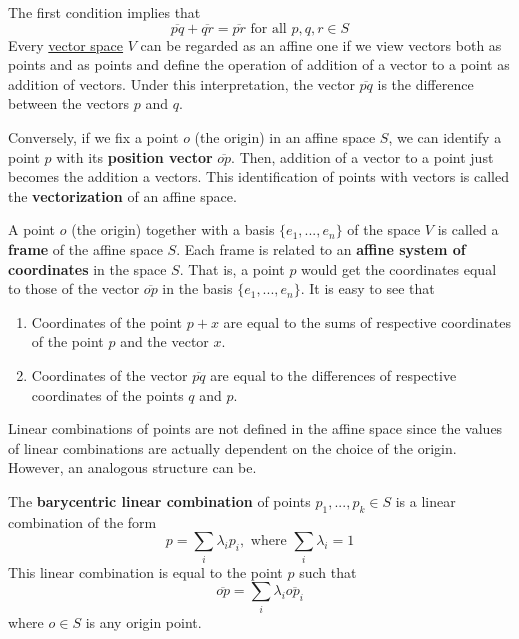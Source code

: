   The first condition implies that
  \begin{equation}
    \overline{pq} + \overline{qr} = \overline{pr} \text{ for all } p, q, r \in S
  \end{equation}
  Every \hyperref[def:vector-space]{vector space} $V$ can be regarded as an affine one if we view vectors both as points and as points and define the operation of addition of a vector to a point as addition of vectors. Under this interpretation, the vector $\overline{pq}$ is the difference between the vectors $p$ and $q$. 

  \begin{definition}
    \label{def:position-vector}
    Conversely, if we fix a point $o$ (the origin) in an affine space $S$, we can identify a point $p$ with its \textbf{position vector} $\overline{op}$. Then, addition of a vector to a point just becomes the addition a vectors. This identification of points with vectors is called the \textbf{vectorization} of an affine space. 
  \end{definition}

  \begin{definition}
    \label{def:frame-of-an-affine-space}
    A point $o$ (the origin) together with a basis $\{e_1, ..., e_n\}$ of the space $V$ is called a \textbf{frame} of the affine space $S$. Each frame is related to an \textbf{affine system of coordinates} in the space $S$. That is, a point $p$ would get the coordinates equal to those of the vector $\overline{op}$ in the basis $\{e_1, ..., e_n\}$. It is easy to see that 
    \begin{enumerate}
      \item Coordinates of the point $p+x$ are equal to the sums of respective coordinates of the point $p$ and the vector $x$. 
      \item Coordinates of the vector $\overline{pq}$ are equal to the differences of respective coordinates of the points $q$ and $p$. 
    \end{enumerate}
  \end{definition}

  Linear combinations of points are not defined in the affine space since the values of linear combinations are actually dependent on the choice of the origin. However, an analogous structure can be. 

  \begin{definition}
    \label{def:barycentric-linear-combination}
    The \textbf{barycentric linear combination} of points $p_1, ..., p_k \in S$ is a linear combination of the form
    \begin{equation}
      p = \sum_i \lambda_i p_i, \text{ where } \sum_i \lambda_i = 1
    \end{equation}
    This linear combination is equal to the point $p$ such that
    \begin{equation}
      \overline{op} = \sum_i \lambda_i \overline{op_i}
    \end{equation}
    where $o \in S$ is any origin point.
  \end{definition}

